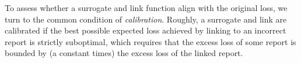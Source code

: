 \documentclass[11pt]{article}
\newcommand{\Comments}{1}
\newcommand{\mynote}[2]{\ifnum\Comments=1\textcolor{#1}{#2}\fi}
\newcommand{\raf}[1]{\mynote{darkgreen}{[RF: #1]}}
\newcommand{\reals}{\mathbb{R}}
\newcommand{\simplex}{\Delta_\Y}
\newcommand{\R}{\mathcal{R}}
\newcommand{\X}{\mathcal{X}}
\newcommand{\Y}{\mathcal{Y}}
\newcommand{\inprod}[2]{\langle #1, #2 \rangle}%
\newtheorem{definition}{Definition}
\begin{document}
To assess whether a surrogate and link function align with the original loss, we turn to the common condition of \emph{calibration}.
Roughly, a surrogate and link are calibrated if the best possible expected loss achieved by linking to an incorrect report is strictly suboptimal, which requires that the excess loss of some report is bounded by (a constant times) the excess loss of the linked report.


\end{document}
